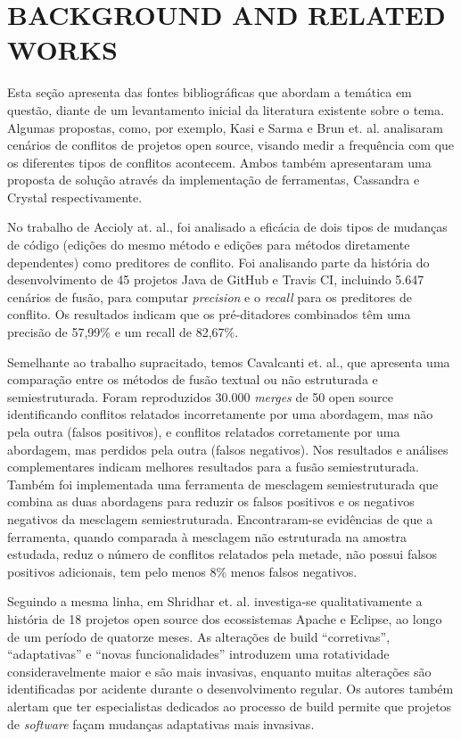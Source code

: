 \documentclass[sigconf,review]{acmart}
\begin{document}
\section{BACKGROUND AND RELATED WORKS}

Esta seção apresenta das fontes bibliográficas que abordam a temática em questão, diante de um levantamento inicial da literatura existente sobre o tema. Algumas propostas, como, por exemplo, Kasi e Sarma\cite{kasi2013cassandra} e Brun et. al.\cite{brun2013early} analisaram cenários de conflitos de projetos open source, visando medir a frequência com que os diferentes tipos de conflitos acontecem. Ambos também apresentaram uma proposta de solução através da implementação de ferramentas, Cassandra e Crystal respectivamente.

No trabalho de Accioly at. al.\cite{accioly2018analyzing}, foi analisado a eficácia de dois tipos de mudanças de código (edições do mesmo método e edições para métodos diretamente dependentes) como preditores de conflito. Foi analisando parte da história do desenvolvimento de 45 projetos Java de GitHub e Travis CI, incluindo 5.647 cenários de fusão, para computar \emph{precision} e o \emph{recall} para os preditores de conflito. Os resultados indicam que os pré-ditadores combinados têm uma precisão de 57,99\% e um recall de 82,67\%. 

Semelhante ao trabalho supracitado, temos Cavalcanti et. al.\cite{10.1145/3133883}, que apresenta uma comparação entre os métodos de fusão textual ou não estruturada e semiestruturada. Foram reproduzidos 30.000 \emph{merges} de 50 open source identificando conflitos relatados incorretamente por uma abordagem, mas não pela outra (falsos positivos), e conflitos relatados corretamente por uma abordagem, mas perdidos pela outra (falsos negativos). Nos resultados e análises complementares indicam melhores resultados para a fusão semiestruturada. Também foi implementada uma ferramenta de mesclagem semiestruturada que combina as duas abordagens para reduzir os falsos positivos e os negativos negativos da mesclagem semiestruturada. Encontraram-se evidências de que a ferramenta, quando comparada à mesclagem não estruturada na amostra estudada, reduz o número de conflitos relatados pela metade, não possui falsos positivos adicionais, tem pelo menos 8\% menos falsos negativos.

Seguindo a mesma linha, em Shridhar et. al.\cite{10.1145/2652524.2652547} investiga-se qualitativamente a história de 18 projetos open source dos ecossistemas Apache e Eclipse, ao longo de um período de quatorze meses. As alterações de build “corretivas”, “adaptativas” e “novas funcionalidades” introduzem uma rotatividade consideravelmente maior e são mais invasivas, enquanto muitas alterações são identificadas por acidente durante o desenvolvimento regular. Os autores também alertam que ter especialistas dedicados ao processo de build permite que projetos de \emph{software} façam mudanças adaptativas mais invasivas.
\end{document}
